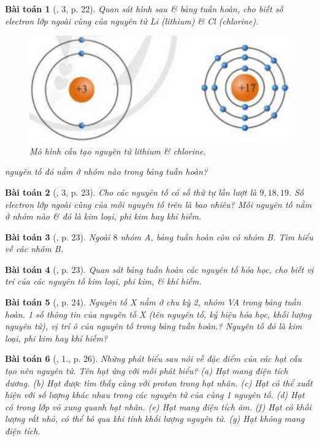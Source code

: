 \documentclass{article}
\newtheorem{baitoan}{Bài toán}
\begin{document}
\begin{baitoan}[\cite{SGK_KHTN_7_Canh_Dieu}, 3, p. 22]
	Quan sát hình sau \& bảng tuần hoàn, cho biết số electron lớp ngoài cùng của nguyên tử \emph{Li} (lithium) \& \emph{Cl} (chlorine).
	\begin{figure}[H]
		\centering
		\includegraphics[scale=0.3]{lithium_chlorine}
		\caption{Mô hình cấu tạo nguyên tử lithium \& chlorine.}
	\end{figure}
	 nguyên tố đó nằm ở nhóm nào trong bảng tuần hoàn?
\end{baitoan}

\begin{baitoan}[\cite{SGK_KHTN_7_Canh_Dieu}, 3, p. 23]
	Cho các nguyên tố có số thứ tự lần lượt là $9,18,19$. Số electron lớp ngoài cùng của mỗi nguyên tố trên là bao nhiêu? Mỗi nguyên tố nằm ở nhóm nào \& đó là kim loại, phi kim hay khí hiếm.
\end{baitoan}

\begin{baitoan}[\cite{SGK_KHTN_7_Canh_Dieu}, p. 23]
	Ngoài $8$ nhóm A, bảng tuần hoàn còn có nhóm B. Tìm hiểu về các nhóm B.
\end{baitoan}

\begin{baitoan}[\cite{SGK_KHTN_7_Canh_Dieu}, p. 23]
	Quan sát bảng tuần hoàn các nguyên tố hóa học, cho biết vị trí của các nguyên tố kim loại, phi kim, \& khí hiếm.
\end{baitoan}

\begin{baitoan}[\cite{SGK_KHTN_7_Canh_Dieu}, p. 24]
	Nguyên tố X nằm ở chu kỳ 2, nhóm VA trong bảng tuần hoàn. 1 số thông tin của nguyên tố X (tên nguyên tố, ký hiệu hóa học, khối lượng nguyên tử), vị trí ô của nguyên tố trong bảng tuần hoàn.? Nguyên tố đó là kim loại, phi kim hay khí hiếm?
\end{baitoan}

\begin{baitoan}[\cite{SGK_KHTN_7_Canh_Dieu}, 1., p. 26]
	Những phát biểu sau nói về đặc điểm của các hạt cấu tạo nên nguyên tử. Tên hạt ứng với mỗi phát biểu? (a) Hạt mang điện tích dương. (b) Hạt được tìm thấy cùng với proton trong hạt nhân. (c) Hạt có thể xuất hiện với số lượng khác nhau trong các nguyên tử của cùng 1 nguyên tố. (d) Hạt có trong lớp vỏ xung quanh hạt nhân. (e) Hạt mang điện tích âm. (f) Hạt có khối lượng rất nhỏ, có thể bỏ qua khi tính khối lượng nguyên tử. (g) Hạt không mang điện tích.
\end{baitoan}
\end{document}
